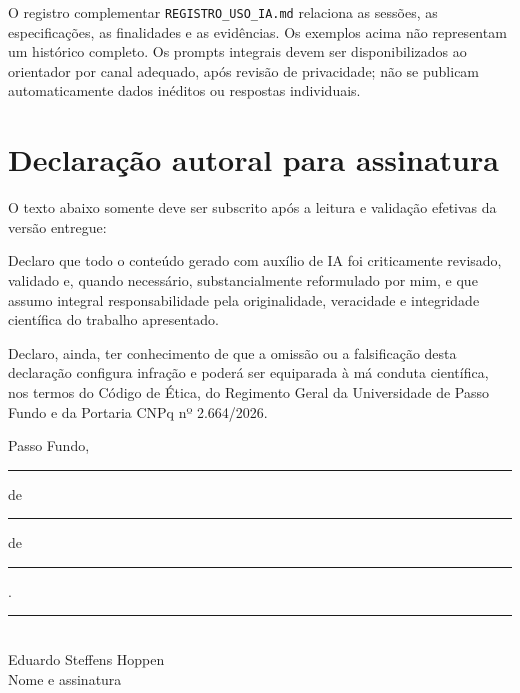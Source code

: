 \documentclass[11pt,a4paper]{article}
\begin{document}
O registro complementar \texttt{REGISTRO\_USO\_IA.md} relaciona as sessões, as especificações, as finalidades e as evidências. Os exemplos acima não representam um histórico completo. Os prompts integrais devem ser disponibilizados ao orientador por canal adequado, após revisão de privacidade; não se publicam automaticamente dados inéditos ou respostas individuais.

\section*{Declaração autoral para assinatura}
O texto abaixo somente deve ser subscrito após a leitura e validação efetivas da versão entregue:

Declaro que todo o conteúdo gerado com auxílio de IA foi criticamente revisado, validado e, quando necessário, substancialmente reformulado por mim, e que assumo integral responsabilidade pela originalidade, veracidade e integridade científica do trabalho apresentado.

Declaro, ainda, ter conhecimento de que a omissão ou a falsificação desta declaração configura infração e poderá ser equiparada à má conduta científica, nos termos do Código de Ética, do Regimento Geral da Universidade de Passo Fundo e da Portaria CNPq nº 2.664/2026.

\vspace{1em}
Passo Fundo, \rule{1cm}{0.4pt} de \rule{4cm}{0.4pt} de \rule{1.5cm}{0.4pt}.

\vspace{2em}
\begin{center}
\rule{10cm}{0.4pt}\\
Eduardo Steffens Hoppen\\
Nome e assinatura
\end{center}
\end{document}
